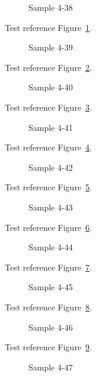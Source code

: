\begin{figure}[tbhp]
\caption{Sample 4-38}
\label{fig:sample-4-38}
\end{figure}

Test reference Figure~\ref{fig:sample-4-38}.

\begin{figure}[tbhp]
\caption{Sample 4-39}
\label{fig:sample-4-39}
\end{figure}

Test reference Figure~\ref{fig:sample-4-39}.

\begin{figure}[tbhp]
\caption{Sample 4-40}
\label{fig:sample-4-40}
\end{figure}

Test reference Figure~\ref{fig:sample-4-40}.

\begin{figure}[tbhp]
\caption{Sample 4-41}
\label{fig:sample-4-41}
\end{figure}

Test reference Figure~\ref{fig:sample-4-41}.

\begin{figure}[tbhp]
\caption{Sample 4-42}
\label{fig:sample-4-42}
\end{figure}

Test reference Figure~\ref{fig:sample-4-42}.

\begin{figure}[tbhp]
\caption{Sample 4-43}
\label{fig:sample-4-43}
\end{figure}

Test reference Figure~\ref{fig:sample-4-43}.

\begin{figure}[tbhp]
\caption{Sample 4-44}
\label{fig:sample-4-44}
\end{figure}

Test reference Figure~\ref{fig:sample-4-44}.

\begin{figure}[tbhp]
\caption{Sample 4-45}
\label{fig:sample-4-45}
\end{figure}

Test reference Figure~\ref{fig:sample-4-45}.

\begin{figure}[tbhp]
\caption{Sample 4-46}
\label{fig:sample-4-46}
\end{figure}

Test reference Figure~\ref{fig:sample-4-46}.

\begin{figure}[tbhp]
\caption{Sample 4-47}
\label{fig:sample-4-47}
\end{figure}

